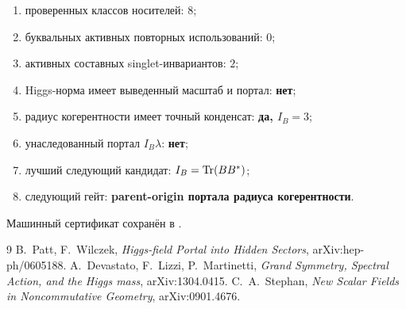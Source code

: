 \begin{protocol}\begin{enumerate}
\item проверенных классов носителей: \textbf{$8$};
\item буквальных активных повторных использований: \textbf{$0$};
\item активных составных singlet-инвариантов: \textbf{$2$};
\item Higgs-норма имеет выведенный масштаб и портал: \textbf{нет};
\item радиус когерентности имеет точный конденсат: \textbf{да, $I_B=3$};
\item унаследованный портал $I_B\lambda$: \textbf{нет};
\item лучший следующий кандидат: \textbf{$I_B=\operatorname{Tr}(BB^*)$};
\item следующий гейт: \textbf{parent-origin портала радиуса когерентности}.
\end{enumerate}\end{protocol}

Машинный сертификат сохранён в
.

\begin{thebibliography}{9}
B.~Patt, F.~Wilczek,
\emph{Higgs-field Portal into Hidden Sectors},
arXiv:hep-ph/0605188.
A.~Devastato, F.~Lizzi, P.~Martinetti,
\emph{Grand Symmetry, Spectral Action, and the Higgs mass},
arXiv:1304.0415.
C.~A.~Stephan,
\emph{New Scalar Fields in Noncommutative Geometry},
arXiv:0901.4676.
\end{thebibliography}